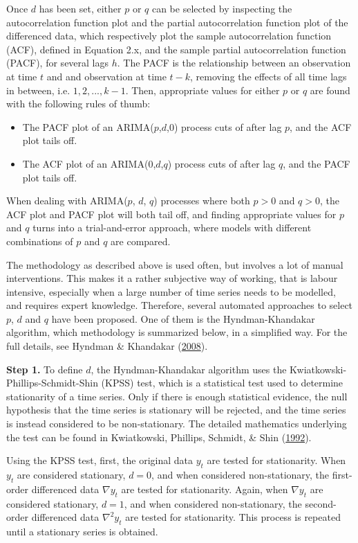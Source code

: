 \documentclass[12pt,oneside]{reedthesis}
\providecommand{\tightlist}{%
  \setlength{\itemsep}{0pt}\setlength{\parskip}{0pt}}
\begin{document}
Once \(d\) has been set, either \(p\) or \(q\) can be selected by
inspecting the autocorrelation function plot and the partial
autocorrelation function plot of the differenced data, which
respectively plot the sample autocorrelation function (ACF), defined in
Equation 2.x, and the sample partial autocorrelation function (PACF),
for several lags \(h\). The PACF is the relationship between an
observation at time \(t\) and and observation at time \(t-k\), removing
the effects of all time lags in between, i.e. \(1, 2, ..., k-1\). Then,
appropriate values for either \(p\) or \(q\) are found with the
following rules of thumb:
\begin{itemize}
\tightlist
\item
  The PACF plot of an ARIMA(\(p\),\(d\),\(0\)) process cuts of after lag
  \(p\), and the ACF plot tails off.
\item
  The ACF plot of an ARIMA(\(0\),\(d\),\(q\)) process cuts of after lag
  \(q\), and the PACF plot tails off.
\end{itemize}
When dealing with ARIMA(\(p\), \(d\), \(q\)) processes where both
\(p > 0\) and \(q > 0\), the ACF plot and PACF plot will both tail off,
and finding appropriate values for \(p\) and \(q\) turns into a
trial-and-error approach, where models with different combinations of
\(p\) and \(q\) are compared.

The methodology as described above is used often, but involves a lot of
manual interventions. This makes it a rather subjective way of working,
that is labour intensive, especially when a large number of time series
needs to be modelled, and requires expert knowledge. Therefore, several
automated approaches to select \(p\), \(d\) and \(q\) have been
proposed. One of them is the Hyndman-Khandakar algorithm, which
methodology is summarized below, in a simplified way. For the full
details, see Hyndman \& Khandakar
(\protect\hyperlink{ref-forecast}{2008}).

\textbf{Step 1.} To define \(d\), the Hyndman-Khandakar algorithm uses
the Kwiatkowski-Phillips-Schmidt-Shin (KPSS) test, which is a
statistical test used to determine stationarity of a time series. Only
if there is enough statistical evidence, the null hypothesis that the
time series is stationary will be rejected, and the time series is
instead considered to be non-stationary. The detailed mathematics
underlying the test can be found in Kwiatkowski, Phillips, Schmidt, \&
Shin (\protect\hyperlink{ref-kwiat1992}{1992}).

Using the KPSS test, first, the original data \(y_{t}\) are tested for
stationarity. When \(y_{t}\) are considered stationary, \(d = 0\), and
when considered non-stationary, the first-order differenced data
\(\nabla y_{t}\) are tested for stationarity. Again, when
\(\nabla y_{t}\) are considered stationary, \(d = 1\), and when
considered non-stationary, the second-order differenced data
\(\nabla^{2} y_{t}\) are tested for stationarity. This process is
repeated until a stationary series is obtained.
\end{document}
